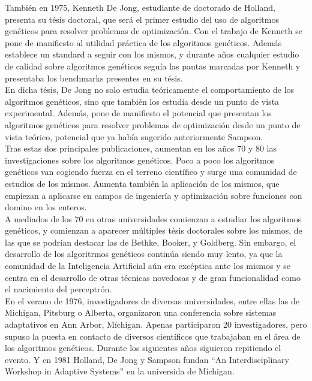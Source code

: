 \documentclass[12pt]{article} \usepackage[utf8x]{inputenc}
\begin{document}
También en 1975, Kenneth De Jong, estudiante de doctorado de Holland,
presenta su tésis doctoral, que será el primer estudio del uso de
algoritmos genéticos para resolver problemas de optimización. Con el
trabajo de Kenneth se pone de manifiesto al utilidad práctica de los
algoritmos genéticos. Además establece un standard a seguir con los
mismos, y durante años cualquier estudio de calidad sobre algoritmos
genéticos seguía las pautas marcadas por Kenneth y presentaba
los benchmarks presentes en su tésis.\\

En dicha tésis, De Jong no solo estudia teóricamente el comportamiento
de los algoritmos genéticos, sino que también los estudia desde un
punto de vista experimental. Además, pone de manifiesto el potencial
que presentan los algoritmos genéticos para resolver problemas de
optimización desde un punto de vista teórico,
potencial que ya había sugerido anteriormente Sampson.\\

Tras estas dos principales publicaciones, aumentan en los años 70 y 80
las investigaciones sobre los algoritmos genéticos. Poco a poco los
algoritmos genéticos van cogiendo fuerza en el terreno científico y
surge una comunidad de estudios de los mismos.  Aumenta también la
aplicación de los mismos, que empiezan a aplicarse en campos de
ingeniería y optimización sobre funciones con domino en los enteros.\\

A mediados de los 70 en otras universidades comienzan a estudiar los
algoritmos genéticos, y comienzan a aparecer múltiples tésis
doctorales sobre los mismos, de las que se podrían destacar las de
Bethke, Booker, y Goldberg. Sin embargo, el desarrollo de los
algoritrmos genéticos continúa siendo muy lento, ya que la comunidad
de la Inteligencia Artificial aún era excéptica ante los mismos y se
centra en el desarrollo de otras técnicas novedosas
y de gran funcionalidad como el nacimiento del perceptrón.\\

En el verano de 1976, investigadores de diversas universidades, entre
ellas las de Michigan, Pitsburg o Alberta, organizaron una conferencia
sobre sistemas adaptativos en Ann Arbor, Míchigan. Apenas participaron
20 investigadores, pero supuso la puesta en contacto de diversos
científicos que trabajaban en el área de los algoritmos
genéticos. Durante los siguientes años siguieron repitiendo el
evento. Y en 1981 Holland, De Jong y Sampson fundan ``An
Interdisciplinary Workshop in Adaptive Systems'' en la universida de Míchigan.\\
\end{document}
